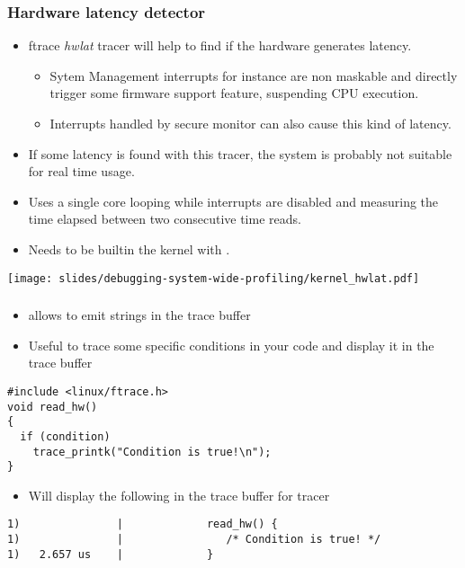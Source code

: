 \begin{frame}
  \frametitle{Hardware latency detector}
  \begin{itemize}
    \item ftrace {\em hwlat} tracer will help to find if the hardware generates
          latency.
    \begin{itemize}
      \item Sytem Management interrupts for instance are non maskable and
            directly trigger some firmware support feature, suspending CPU execution.
      \item Interrupts handled by secure monitor can also cause this kind of
            latency.
    \end{itemize}
    \item If some latency is found with this tracer, the system is probably
          not suitable for real time usage.
    \item Uses a single core looping while interrupts are disabled and measuring
          the time elapsed between two consecutive time reads.
    \item Needs to be builtin the kernel with .
  \end{itemize}

  \center\texttt{[image: slides/debugging-system-wide-profiling/kernel\_hwlat.pdf]}
\end{frame}

\begin{frame}[fragile]
  \frametitle{}
  \begin{itemize}
    \item {} allows to emit strings in the trace buffer
    \item Useful to trace some specific conditions in your code and display it in the trace buffer 
  \end{itemize}
  \begin{block}{}
    \begin{verbatim}
#include <linux/ftrace.h>
void read_hw()
{
  if (condition)
    trace_printk("Condition is true!\n");
}
    \end{verbatim}
  \end{block}
  \begin{itemize}
    \item Will display the following in the trace buffer for  tracer
  \end{itemize}
  \begin{block}{}
    \begin{verbatim}
1)               |             read_hw() {
1)               |                /* Condition is true! */
1)   2.657 us    |             }
    \end{verbatim}
  \end{block}
\end{frame}

